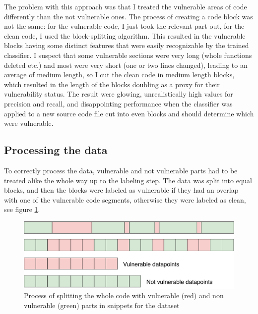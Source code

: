 \documentclass[
a4paper,
pagesize,
pdftex,
12pt,
twoside, %
BCOR=5mm, %
ngerman,
fleqn,
final,
]{scrartcl}
\begin{document}
	The problem with this approach was that I treated the vulnerable areas of code differently than the not vulnerable ones. The process of creating a code block was not the same: for the vulnerable code, I just took the relevant part out, for the clean code, I used the block-splitting algorithm. This resulted in the vulnerable blocks having some distinct features that were easily recognizable by the trained classifier. I suspect that some vulnerable sections were very long (whole functions deleted etc.) and most were very short (one or two lines changed), leading to an average of medium length, so I cut the clean code in medium length blocks, which resulted in the length of the blocks doubling as a proxy for their vulnerability status. The result were glowing, unrealistically high values for precision and recall, and disappointing performance when the classifier was applied to a new source code file cut into even blocks and should determine which were vulnerable.\\
	
	\subsection{Processing the data}\label{Processing}
	To correctly process the data, vulnerable and not vulnerable parts had to be treated alike the whole way up to the labeling step. The data was split into equal blocks, and then the blocks were labeled as vulnerable if they had an overlap with one of the vulnerable code segments, otherwise they were labeled as clean, see figure \ref{fig:collectData2}.
	
	\begin{figure}[ht]
		\centering
		\includegraphics[width=0.8\linewidth]{img/collectData2}
		\caption{Process of splitting the whole code with vulnerable (red) and non vulnerable (green) parts in snippets for the dataset}
		\label{fig:collectData2}
	\end{figure}
	
\end{document}
